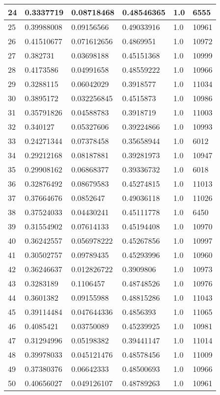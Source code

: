 \begin{longtable}{|l|l|l|l|l|l|}
24 & 0.3337719 & 0.08718468 & 0.48546365 & 1.0 & 6555 \\ \hline 
25 & 0.39988008 & 0.09156566 & 0.49033916 & 1.0 & 10961 \\ \hline 
26 & 0.41510677 & 0.071612656 & 0.4869951 & 1.0 & 10972 \\ \hline 
27 & 0.382731 & 0.03698188 & 0.45151368 & 1.0 & 10999 \\ \hline 
28 & 0.4173586 & 0.04991658 & 0.48559222 & 1.0 & 10966 \\ \hline 
29 & 0.3288115 & 0.06042029 & 0.3918577 & 1.0 & 11034 \\ \hline 
30 & 0.3895172 & 0.032256845 & 0.4515873 & 1.0 & 10986 \\ \hline 
31 & 0.35791826 & 0.04588783 & 0.3918719 & 1.0 & 11003 \\ \hline 
32 & 0.340127 & 0.05327606 & 0.39224866 & 1.0 & 10993 \\ \hline 
33 & 0.24271344 & 0.07378458 & 0.35658944 & 1.0 & 6012 \\ \hline 
34 & 0.29212168 & 0.08187881 & 0.39281973 & 1.0 & 10947 \\ \hline 
35 & 0.29908162 & 0.06868377 & 0.39336732 & 1.0 & 6018 \\ \hline 
36 & 0.32876492 & 0.08679583 & 0.45274815 & 1.0 & 11013 \\ \hline 
37 & 0.37664676 & 0.0852647 & 0.49036118 & 1.0 & 11026 \\ \hline 
38 & 0.37524033 & 0.04430241 & 0.45111778 & 1.0 & 6450 \\ \hline 
39 & 0.31554902 & 0.07614133 & 0.45194408 & 1.0 & 10970 \\ \hline 
40 & 0.36242557 & 0.056978222 & 0.45267856 & 1.0 & 10997 \\ \hline 
41 & 0.30502757 & 0.09789435 & 0.45293996 & 1.0 & 10960 \\ \hline 
42 & 0.36246637 & 0.012826722 & 0.3909806 & 1.0 & 10973 \\ \hline 
43 & 0.3283189 & 0.1106457 & 0.48748526 & 1.0 & 10976 \\ \hline 
44 & 0.3601382 & 0.09155988 & 0.48815286 & 1.0 & 11043 \\ \hline 
45 & 0.39114484 & 0.047644336 & 0.4856393 & 1.0 & 11065 \\ \hline 
46 & 0.4085421 & 0.03750089 & 0.45239925 & 1.0 & 10981 \\ \hline 
47 & 0.31294996 & 0.05198382 & 0.39441147 & 1.0 & 11014 \\ \hline 
48 & 0.39978033 & 0.045121476 & 0.48578456 & 1.0 & 11009 \\ \hline 
49 & 0.37380376 & 0.06642333 & 0.48500693 & 1.0 & 10966 \\ \hline 
50 & 0.40656027 & 0.049126107 & 0.48789263 & 1.0 & 10961 \\ \hline 
\end{longtable}